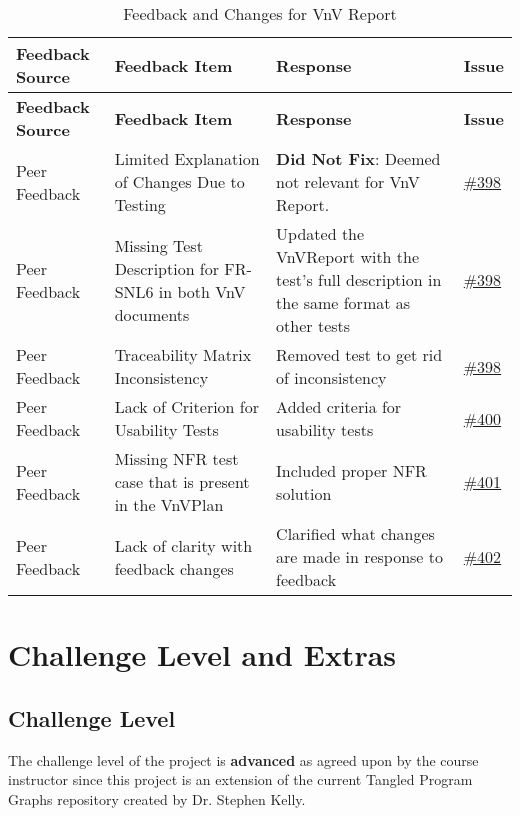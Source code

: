\documentclass{article}
\begin{document}
\begin{longtable}{| p{} | p{} | p{} | p{} |}
    \caption{Feedback and Changes for VnV Report} \\
    \hline
    \textbf{Feedback Source} & \textbf{Feedback Item} & \textbf{Response} & \textbf{Issue} \\
    \hline
    \endfirsthead
    \hline
    \textbf{Feedback Source} & \textbf{Feedback Item} & \textbf{Response} & \textbf{Issue} \\
    \hline
    \endhead
    \hline
    \endfoot
    Peer Feedback & Limited Explanation of Changes Due to Testing   & \textbf{Did Not Fix}: Deemed not relevant for VnV Report.  & \href{https://github.com/TPGEngine/tpg/issues/398}{\#398} \\
    \hline
    Peer Feedback & Missing Test Description for FR-SNL6 in both VnV documents  & Updated the VnVReport with the test's full description in the same format as other tests & \href{https://github.com/TPGEngine/tpg/issues/398}{\#398} \\
    \hline
    Peer Feedback & Traceability Matrix Inconsistency  & Removed test to get rid of inconsistency & \href{https://github.com/TPGEngine/tpg/issues/398}{\#398} \\
    \hline
    Peer Feedback & Lack of Criterion for Usability Tests & Added criteria for usability tests & \href{https://github.com/TPGEngine/tpg/issues/400}{\#400} \\
    \hline
    Peer Feedback & Missing NFR test case that is present in the VnVPlan & Included proper NFR solution & \href{https://github.com/TPGEngine/tpg/issues/401}{\#401} \\
    \hline
    Peer Feedback & Lack of clarity with feedback changes & Clarified what changes are made in response to feedback & \href{https://github.com/TPGEngine/tpg/issues/402}{\#402} \\
    \hline

\end{longtable}

\section{Challenge Level and Extras}

\subsection{Challenge Level}
The challenge level of the project is \textbf{advanced} as agreed upon by the course instructor since this project is an extension of the current Tangled Program Graphs repository created by Dr. Stephen Kelly.
\end{document}
